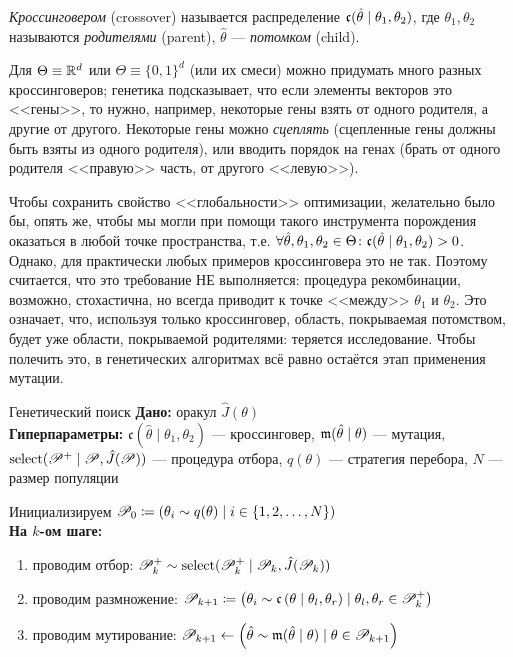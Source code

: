\newcommand{\cross}{\mathfrak{c}}
\begin{definition}
\emph{Кроссинговером} (crossover) называется распределение $\cross(\hat{\theta} \HM\mid \theta_1, \theta_2)$, где $\theta_1, \theta_2$ называются \emph{родителями} (parent), $\hat{\theta}$ --- \emph{потомком} (child).
\end{definition}

\begin{example}
Для $\Theta \equiv \mathbb{R}^d$ или $\Theta \equiv \{0, 1\}^d$ (или их смеси) можно придумать много разных кроссинговеров; генетика подсказывает, что если элементы векторов это <<гены>>, то нужно, например, некоторые гены взять от одного родителя, а другие от другого. Некоторые гены можно \emph{сцеплять} (сцепленные гены должны быть взяты из одного родителя), или вводить порядок на генах (брать от одного родителя <<правую>> часть, от другого <<левую>>).
\end{example}

Чтобы сохранить свойство <<глобальности>> оптимизации, желательно было бы, опять же, чтобы мы могли при помощи такого инструмента порождения оказаться в любой точке пространства, т.е. $\forall \hat{\theta}, \theta_1, \theta_2 \HM\in \Theta \colon \cross(\hat{\theta} \HM\mid \theta_1, \theta_2) > 0$. Однако, для практически любых примеров кроссинговера это не так. Поэтому считается, что это требование НЕ выполняется: процедура рекомбинации, возможно, стохастична, но всегда приводит к точке <<между>> $\theta_1$ и $\theta_2$. Это означает, что, используя только кроссинговер, область, покрываемая потомством, будет уже области, покрываемой родителями: теряется исследование. Чтобы полечить это, в генетических алгоритмах всё равно остаётся этап применения мутации.

\begin{algorithm}[label=geneticsearch]{Генетический поиск}
\textbf{Дано:} оракул $\hat{J}(\theta)$ \\
\textbf{Гиперпараметры:} $\cross(\hat{\theta} \mid \theta_1, \theta_2)$ --- кроссинговер, $\mathfrak{m}(\hat{\theta} \mid \theta)$ --- мутация, $\mathrm{select}(\mathscr{P}^+ \mid \mathscr{P}, \hat{J}(\mathscr{P}))$ --- процедура отбора, $q(\theta)$ --- стратегия перебора, $N$ --- размер популяции

\vspace{0.3cm}
Инициализируем $\mathscr{P}_0 \coloneqq \left( \theta_i \sim q(\theta) \mid i \in \{1, 2, \dots , N \} \right)$ \\
\textbf{На $k$-ом шаге:}
\begin{enumerate}
    \item проводим отбор: $\mathscr{P}^{+}_k \sim \mathrm{select}(\mathscr{P}^{+}_k \mid \mathscr{P}_k, \hat{J}(\mathscr{P}_k))$
    \item проводим размножение: $\Pop_{k+1} \coloneqq \left( \theta_i \sim \cross \left( \theta \mid \theta_l, \theta_r \right) \mid \theta_l, \theta_r \in \Pop^{+}_k \right)$
    \item проводим мутирование: $\mathscr{P}_{k+1} \leftarrow \left( \hat{\theta} \sim \mathfrak{m} (\hat{\theta} \mid \theta) \mid \theta \in \mathscr{P}_{k+1} \right)$
\end{enumerate}
\end{algorithm}

